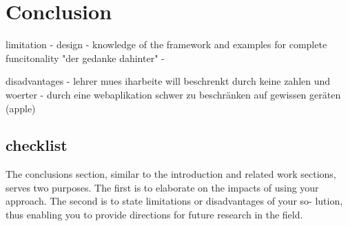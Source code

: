 
\chapter{Conclusion}
\label{chap:conclusion}

limitation
- design
- knowledge of the framework and examples for complete funcitonality "der gedanke dahinter"
-

disadvantages
- lehrer mues iharbeite will beschrenkt durch keine zahlen und woerter
- durch eine webaplikation schwer zu beschränken auf gewissen geräten (apple)


\section{checklist}
The conclusions section, similar to the introduction and
related work sections, serves two purposes. The first is
to elaborate on the impacts of using your approach. The
second is to state limitations or disadvantages of your so-
lution, thus enabling you to provide directions for future
research in the field.

